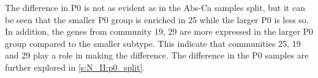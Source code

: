 The difference in P0 is not as evident as in the Abs-Ca samples split, but it can be seen that the smaller P0 group is enriched in 25 while the larger P0 is less so. In addition, the genes from community 19, 29 are more expressed in the larger P0 group compared to the smaller subtype. This indicate that communities 25, 19 and 29 play a role in making the difference. The difference in the P0 samples are further explored in \cref{s:N_II:p0_split}.





